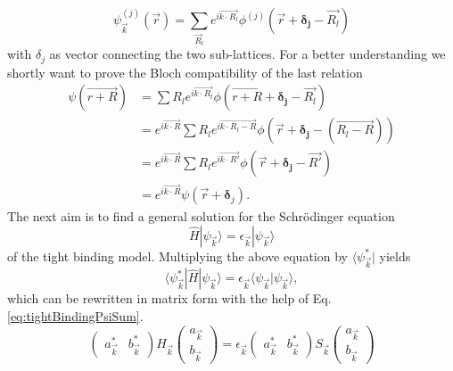 		\begin{equation}
			\label{eq:tightBindingBlochWave}
			\psi_\vec k^{(j)}(\vec r) = \sum_{\vec R_l} e^{i \vec{k \cdot R_l}} \phi^{(j)}(\vec{r} + \boldsymbol{\delta_j} - \vec{R_l})
		\end{equation}
		with $\delta_j$ as vector connecting the two sub-lattices. For a better understanding we shortly want to prove the Bloch compatibility of the last relation
		\begin{equation}
			\begin{split}
				\psi(\vec{r + R}) &= \sum{R_l} e^{i \vec{k \cdot R_l}} \phi(\vec{r + R} + \boldsymbol{\delta_j} - \vec{R_l}) \\
				&=  e^{i \vec{k \cdot R}}\sum{R_l} e^{i \vec{k \cdot R_l - R}} \phi(\vec{r} + \boldsymbol{\delta_j} - (\vec{R_l - R} )) \\
				&= e^{i \vec{k \cdot R}}\sum{R_l} e^{i \vec{k \cdot R'}} \phi(\vec{r} + \boldsymbol{\delta_j} - \vec{R'} ) \\
				&= e^{i \vec{k \cdot R}} \psi(\vec r + \boldsymbol \delta_j).
			\end{split}				
		\end{equation}
		The next aim is to find a general solution for the Schrödinger equation
		\begin{equation}
			\hat H | \psi_\vec k \rangle = \epsilon_\vec k | \psi_\vec k \rangle
		\end{equation}
		of the tight binding model. Multiplying the above equation by $\langle \psi_\vec k^* |$ yields
		\begin{equation}
			\langle \psi_\vec k^* | \hat H | \psi_\vec k \rangle = \epsilon_\vec k \langle \psi_\vec k | \psi_\vec k \rangle,
		\end{equation}
		which can be rewritten in matrix form with the help of Eq. \ref{eq:tightBindingPsiSum}.
		\begin{equation}
			\begin{pmatrix}
				a_\vec k^* & b_\vec k^*
			\end{pmatrix}
			 H_\vec k 
			 \begin{pmatrix}
				a_\vec k \\
				b_\vec k
			 \end{pmatrix}
			 = \epsilon_\vec k 
			 \begin{pmatrix}
				a_\vec k^* & b_\vec k^*
			 \end{pmatrix}
			  S_\vec k 
			 \begin{pmatrix}
			 	a_\vec k \\
				b_\vec k
			\end{pmatrix}
		\end{equation}
